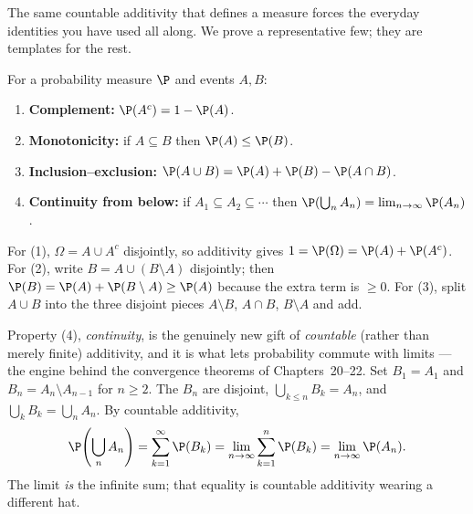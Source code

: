 The same countable additivity that defines a measure forces the everyday
identities you have used all along. We prove a representative few; they are
templates for the rest.

\begin{proposition}
\label{ch36:props}
For a probability measure $\P$ and events $A, B$:
\begin{enumerate}
  \item \textbf{Complement:} $\P(A^c) = 1 - \P(A)$.
  \item \textbf{Monotonicity:} if $A \subseteq B$ then $\P(A) \le \P(B)$.
  \item \textbf{Inclusion--exclusion:} $\P(A \cup B) = \P(A) + \P(B) - \P(A\cap B)$.
  \item \textbf{Continuity from below:} if $A_1 \subseteq A_2 \subseteq \cdots$
        then $\P\!\left(\bigcup_n A_n\right) = \lim_{n\to\infty} \P(A_n)$.
\end{enumerate}
\end{proposition}

\begin{whybox}
For (1), $\Omega = A \cup A^c$ disjointly, so additivity gives
$1 = \P(\Omega) = \P(A) + \P(A^c)$.
For (2), write $B = A \cup (B \setminus A)$ disjointly; then
$\P(B) = \P(A) + \P(B\setminus A) \ge \P(A)$ because the extra term is $\ge 0$.
For (3), split $A \cup B$ into the three disjoint pieces
$A\setminus B$, $A\cap B$, $B\setminus A$ and add.

Property (4), \emph{continuity}, is the genuinely new gift of \emph{countable}
(rather than merely finite) additivity, and it is what lets probability commute
with limits --- the engine behind the convergence theorems of Chapters~20--22.
Set $B_1 = A_1$ and $B_n = A_n \setminus A_{n-1}$ for $n \ge 2$. The $B_n$ are
disjoint, $\bigcup_{k\le n} B_k = A_n$, and $\bigcup_k B_k = \bigcup_n A_n$. By
countable additivity,
\[
  \P\!\left(\bigcup_n A_n\right) = \sum_{k=1}^{\infty} \P(B_k)
  = \lim_{n\to\infty} \sum_{k=1}^{n} \P(B_k)
  = \lim_{n\to\infty} \P(A_n).
\]
The limit \emph{is} the infinite sum; that equality is countable additivity wearing
a different hat.
\end{whybox}

